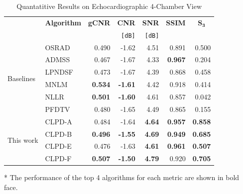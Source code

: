 \begin{table}
  \centering
  \caption{Quantatitive Results on Echocardiographic 4-Chamber View}\label{table:cardiac3}
  \setlength{\tabcolsep}{3pt}
  \begin{threeparttable}
  \begin{tabular}{llrrrrr}
    \toprule
    & \multicolumn{1}{c}{\textbf{Algorithm}}
    & \multicolumn{1}{c}{\textbf{gCNR}}
    & \multicolumn{1}{c}{\textbf{CNR}}
    & \multicolumn{1}{c}{\textbf{SNR}}
    & \multicolumn{1}{c}{\textbf{SSIM}}
    & \multicolumn{1}{c}{\(\mathbf{S_{3}}\)}\\
    & \multicolumn{1}{c}{}
    & \multicolumn{1}{c}{}
    & \texttt{[dB]}
    & \texttt{[dB]}
    & \multicolumn{1}{c}{}
    & \multicolumn{1}{c}{} \\\midrule
    \multirow{6}{*}{Baselines}
    & OSRAD  & 0.490          & -1.62          & 4.51          & 0.891          & 0.500 \\
    & ADMSS  & 0.467          & -1.67          & 4.33          & \textbf{0.967} & 0.204 \\
    & LPNDSF & 0.473          & -1.67          & 4.39          & 0.868          & 0.458 \\
    & MNLM   & \textbf{0.534} & \textbf{-1.61} & 4.42          & 0.918          & 0.414 \\
    & NLLR   & \textbf{0.501} & \textbf{-1.60} & 4.61          & 0.857          & 0.042\\
    & PFDTV  & 0.480          & -1.65          & 4.49          & 0.865          & 0.155 \\\midrule
    \multirow{4}{*}{This work}
    & CLPD-A & 0.484          & -1.64          & \textbf{4.64} & \textbf{0.957} & \textbf{0.858} \\
    & CLPD-B & \textbf{0.496} & \textbf{-1.55} & \textbf{4.69} & \textbf{0.949} & \textbf{0.685} \\
    & CLPD-E & 0.476          & -1.63          & \textbf{4.61} & \textbf{0.961} & \textbf{0.507} \\
    & CLPD-F & \textbf{0.507} & \textbf{-1.50} & \textbf{4.79} & 0.920          & \textbf{0.705} \\\bottomrule
  \end{tabular}
  \begin{tablenotes}
    \item[*] The performance of the top 4 algorithms for each metric are shown in bold face.
  \end{tablenotes}
  \end{threeparttable}
\end{table}
%

%
